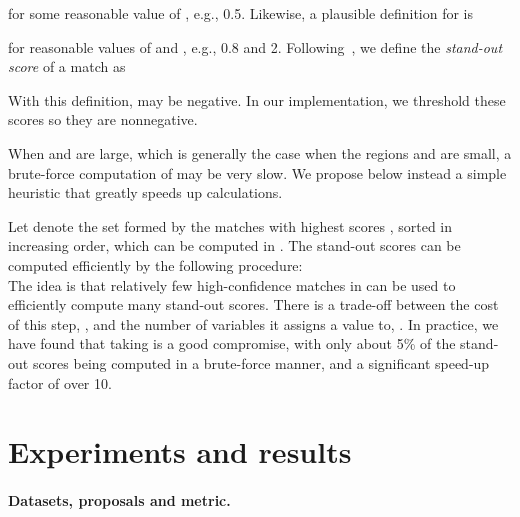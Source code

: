 \documentclass[10pt,twocolumn,letterpaper]{article}
\numberwithin{theorem}{section}
\begin{document}
for some reasonable value of , e.g., 0.5.
Likewise, a plausible definition for  is

for reasonable values of  and , e.g., 0.8 and 2.
Following~\cite{CKSP15}, we define the {\em stand-out score} of a match
 as

With this definition,  may be negative. In our implementation,
we threshold 
these scores so they are nonnegative.

When  and  are large, which is generally the case when
the regions  and  are small, a brute-force computation
of  may be very slow. We propose below instead a simple
heuristic that greatly speeds up calculations.

Let  denote the set formed by the  matches  with
highest scores , sorted in increasing order, which can be
computed in .  The stand-out scores can be
computed efficiently by the following procedure:
\\

The idea is  that relatively few high-confidence matches  in 
can be used to efficiently compute many stand-out scores. There is
a trade-off between the cost of this step, , and the number of variables  it assigns
a value to, . In practice, we have
found that taking  is a good compromise, with only about 5\%
of the stand-out scores being computed in a brute-force manner, and
a significant speed-up factor of over 10. 
\section{Experiments and results}
\paragraph{Datasets, proposals and metric.} 
\end{document}
